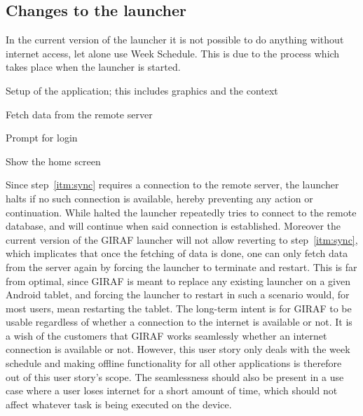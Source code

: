 \subsection{Changes to the launcher}
\label{sub:changes_to_the_launcher}
In the current version of the launcher it is not possible to do anything without internet access, let alone use Week Schedule.
This is due to the process which takes place when the launcher is started. 
\begin{enumberate}
    \item Setup of the application; this includes graphics and the context
    \item\label{itm:sync} Fetch data from the remote server
    \item Prompt for login
    \item Show the home screen
\end{enumberate}
Since step~\ref{itm:sync} requires a connection to the remote server, the launcher halts if no such connection is available, hereby preventing any action or continuation.
While halted the launcher repeatedly tries to connect to the remote database, and will continue when said connection is established.
Moreover the current version of the GIRAF launcher will not allow reverting to step~\ref{itm:sync}, which implicates that once the fetching of data is done, one can only fetch data from the server again by forcing the launcher to terminate and restart.
This is far from optimal, since GIRAF is meant to replace any existing launcher on a given Android tablet, and forcing the launcher to restart in such a scenario would, for most users, mean restarting the tablet.
The long-term intent is for GIRAF to be usable regardless of whether a connection to the internet is available or not.
It is a wish of the customers that GIRAF works seamlessly whether an internet connection is available or not.
However, this user story only deals with the week schedule and making offline functionality for all other applications is therefore out of this user story's scope.
The seamlessness should also be present in a use case where a user loses internet for a short amount of time, which should not affect whatever task is being executed on the device. 

